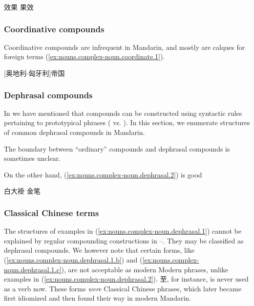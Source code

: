 \documentclass[UTF8, a4paper, oneside, scheme=plain, 12pt]{ctexrep}
\begin{document}
\begin{exe}
    \ex\label{ex:nouns.complex-noun.tautological.2} \begin{xlist}
        \ex\label{ex:nouns.complex-noun.tautological.2.a} 效果
        \ex\label{ex:nouns.complex-noun.tautological.2.b} 果效
    \end{xlist}
\end{exe}

\subsubsection{Coordinative compounds}\label{sec:nouns.complex-noun.coordinate}

Coordinative compounds are infrequent in Mandarin,
and mostly are calques for foreign terms (\ref{ex:nouns.complex-noun.coordinate.1}).

\begin{exe}
    \ex\label{ex:nouns.complex-noun.coordinate.1}
    [奥地利-匈牙利]帝国
\end{exe}

\subsubsection{Dephrasal compounds}

In  we have mentioned that 
compounds can be constructed using syntactic rules pertaining to prototypical phrases
( vs. ).
In this section, we enumerate structures of common dephrasal compounds in Mandarin.

The boundary between ``ordinary'' compounds and dephrasal compounds is sometimes unclear.


On the other hand, (\ref{ex:nouns.complex-noun.dephrasal.2}) is good 

\begin{exe}
    \ex \label{ex:nouns.complex-noun.dephrasal.2}
    \begin{xlist}
        \ex 白大褂
        \ex 金笔
    \end{xlist}
\end{exe}

\subsubsection{Classical Chinese terms}

The structures of examples in (\ref{ex:nouns.complex-noun.dephrasal.1})
cannot be explained by regular compounding constructions in
--.
They may be classified as dephrasal compounds.
We however note that certain forms, like (\ref{ex:nouns.complex-noun.dephrasal.1.b})
and (\ref{ex:nouns.complex-noun.dephrasal.1.c}),
are not acceptable as modern Modern phrases,
unlike examples in (\ref{ex:nouns.complex-noun.dephrasal.2}).
至, for instance, is never used as a verb now.
These forms \emph{were} Classical Chinese phrases,
which later became first idiomized and then found their way in modern Mandarin.
\end{document}
